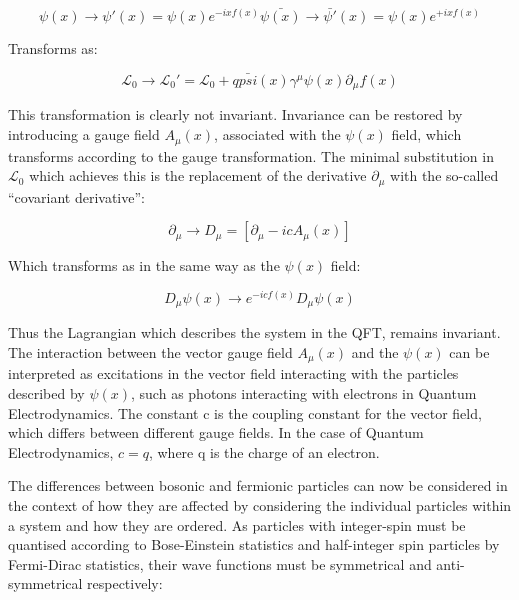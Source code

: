 \begin{equation}
\psi(x) \rightarrow \psi'(x) = \psi(x)e^{-ixf(x)}
\bar{\psi(x)} \rightarrow \bar{\psi'}(x) = \psi(x)e^{+ixf(x)}
\end{equation}

Transforms as:

\begin{equation}
\mathcal{L}_{0} \rightarrow \mathcal{L}_{0}' = \mathcal{L}_{0} + q \bar{psi}(x)\gamma^{\mu}\psi(x)\partial_{\mu}f(x)
\end{equation}

This transformation is clearly not invariant. Invariance can be restored by introducing a gauge field $A_{\mu}(x)$, associated with the $\psi(x)$ field, which transforms according to the gauge transformation. 
The minimal substitution in $\mathcal{L}_{0}$ which achieves this is the replacement of the derivative $\partial_{\mu}$  with the so-called ``covariant derivative''\cite{QFT}:

\begin{equation}
\partial_{\mu} \rightarrow D_{\mu} = [ \partial_{\mu} - icA_{\mu}(x) ]
\end{equation}

Which transforms as in the same way as the $\psi(x)$ field:

\begin{equation}
D_{\mu}\psi(x) \rightarrow e^{-icf(x)}D_{\mu}\psi(x)
\end{equation}

Thus the Lagrangian which describes the system in the QFT, remains invariant. 
The interaction between the vector gauge field $A_{\mu}(x)$ and the $\psi(x)$ can be interpreted as excitations in the vector field interacting with the particles described by $\psi(x)$, such as photons interacting with electrons in Quantum Electrodynamics. 
The constant c is the coupling constant for the vector field, which differs between different gauge fields. 
In the case of Quantum Electrodynamics, $c = q$, where q is the charge of an electron\cite{QFT}.

The differences between bosonic and fermionic particles can now be considered in the context of how they are affected by considering the individual particles within a system and how they are ordered. 
As particles with integer-spin must be quantised according to Bose-Einstein statistics and half-integer spin particles by Fermi-Dirac statistics, their wave functions must be symmetrical and anti-symmetrical respectively\cite{QM}:

